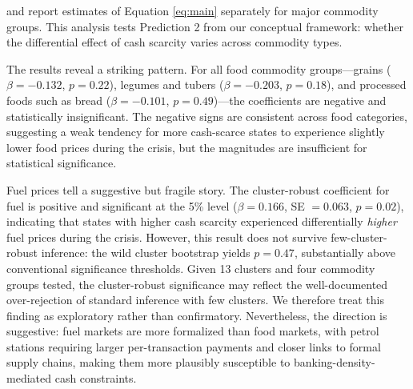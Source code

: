 \documentclass[12pt]{article}
\begin{document}
 and  report estimates of Equation \ref{eq:main} separately for major commodity groups. This analysis tests Prediction 2 from our conceptual framework: whether the differential effect of cash scarcity varies across commodity types.

The results reveal a striking pattern. For all food commodity groups---grains ($\beta = -0.132$, $p = 0.22$), legumes and tubers ($\beta = -0.203$, $p = 0.18$), and processed foods such as bread ($\beta = -0.101$, $p = 0.49$)---the coefficients are negative and statistically insignificant. The negative signs are consistent across food categories, suggesting a weak tendency for more cash-scarce states to experience slightly lower food prices during the crisis, but the magnitudes are insufficient for statistical significance.

Fuel prices tell a suggestive but fragile story. The cluster-robust coefficient for fuel is positive and significant at the 5\% level ($\beta = 0.166$, SE $= 0.063$, $p = 0.02$), indicating that states with higher cash scarcity experienced differentially \textit{higher} fuel prices during the crisis. However, this result does not survive few-cluster-robust inference: the wild cluster bootstrap yields $p = 0.47$, substantially above conventional significance thresholds. Given 13 clusters and four commodity groups tested, the cluster-robust significance may reflect the well-documented over-rejection of standard inference with few clusters. We therefore treat this finding as exploratory rather than confirmatory. Nevertheless, the direction is suggestive: fuel markets are more formalized than food markets, with petrol stations requiring larger per-transaction payments and closer links to formal supply chains, making them more plausibly susceptible to banking-density-mediated cash constraints.
\end{document}
